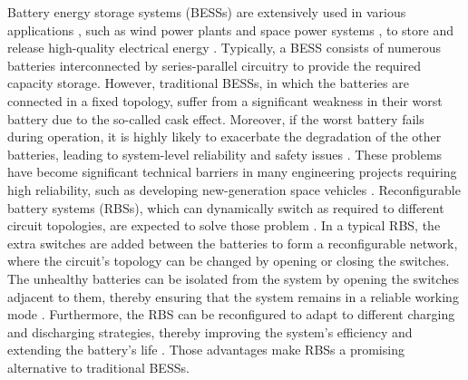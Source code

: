 \documentclass{article}
\begin{document}
Battery energy storage systems (BESSs) are extensively used in various applications \cite{yangBatteryEnergyStorage2018}, such as wind power plants \cite{desiqueiraControlStrategySmooth2021} and space power systems \cite{schwanbeckInternationalSpaceStation2019,zhangDevelopmentProspectChinese2021}, to store and release high-quality electrical energy \cite{choCommercialResearchBattery2015}.
Typically, a BESS consists of numerous batteries interconnected by series-parallel circuitry to provide the required capacity storage.
However, traditional BESSs, in which the batteries are connected in a fixed topology, suffer from a significant weakness in their worst battery due to the so-called cask effect.
Moreover, if the worst battery fails during operation, it is highly likely to exacerbate the degradation of the other batteries, leading to system-level reliability and safety issues \cite{yangUnbalancedDischargingAging2016,fengPropagationMechanismsDiagnosis2019,jeevarajanBatterySafetyQualifications2012}.
These problems have become significant technical barriers in many engineering projects requiring high reliability, such as developing new-generation space vehicles \cite{pomboHybridPowerSystem2021}.  
Reconfigurable battery systems (RBSs), which can dynamically switch as required to different circuit topologies, are expected to solve those problem \cite{hanNextGenerationBatteryManagement2020a}.
In a typical RBS, the extra switches are added between the batteries to form a reconfigurable network, where the circuit's topology can be changed by opening or closing the switches. 
The unhealthy batteries can be isolated from the system by opening the switches adjacent to them, thereby ensuring that the system remains in a reliable working mode \cite{ci2016reconfigurable}. 
Furthermore, the RBS can be reconfigured to adapt to different charging and discharging strategies, thereby improving the system's efficiency and extending the battery's life \cite{bouchhima2018lifetime}. 
Those advantages make RBSs a promising alternative to traditional BESSs. 
\end{document}
